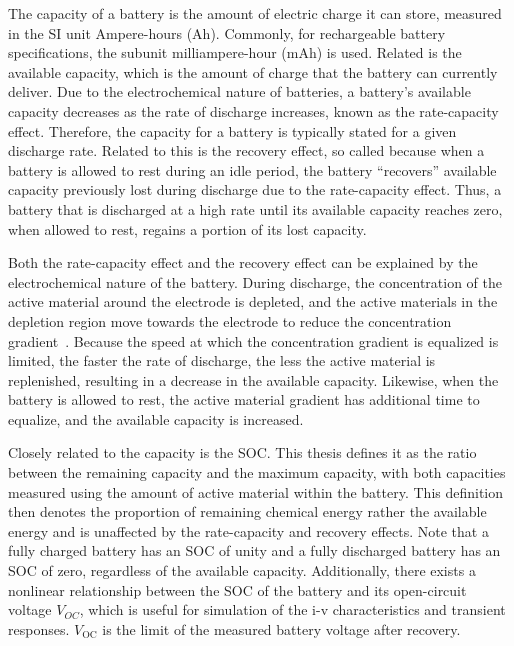 \documentclass[../zhang_thesis.tex]{subfiles}
\begin{document}
The capacity of a battery is the amount of electric charge it can store, measured in the SI unit Ampere-hours (Ah). Commonly, for rechargeable battery specifications, the subunit milliampere-hour (mAh) is used. Related is the available capacity, which is the amount of charge that the battery can currently deliver. Due to the electrochemical nature of batteries, a battery's available capacity decreases as the rate of discharge increases, known as the rate-capacity effect. Therefore, the capacity for a
battery is typically stated for a given discharge rate.  Related to this is the recovery effect, so called because when a battery is allowed to rest during an idle period, the battery ``recovers'' available capacity previously lost during discharge due to the rate-capacity effect. Thus, a battery that is discharged at a high rate until its available capacity reaches zero, when allowed to rest, regains a portion of its lost capacity.

Both the rate-capacity effect and the recovery effect can be explained by the electrochemical nature of the battery. During discharge, the concentration of the active material around the electrode is depleted, and the active materials in the depletion region move towards the electrode to reduce the concentration gradient~\cite{chiasserini99}. Because the speed at which the concentration gradient is equalized is limited, the faster the rate of discharge, the less the active material is
replenished, resulting in a decrease in the available capacity. Likewise, when the battery is allowed to rest, the active material gradient has additional time to equalize, and the available capacity is increased.

Closely related to the capacity is the SOC. This thesis defines it as the ratio between the remaining capacity and the maximum capacity, with both capacities measured using the amount of active material within the battery. This definition then denotes the proportion of remaining chemical energy rather the available energy and is unaffected by the rate-capacity and recovery effects. Note that a fully charged battery has an SOC of unity and a fully discharged battery has an SOC of zero, regardless
of the available capacity. Additionally, there exists a nonlinear relationship between the SOC of the battery and its open-circuit voltage $V_{OC}$, which is useful for simulation of the i-v characteristics and transient responses. $V_\text{OC}$ is the limit of the measured battery voltage after recovery.
\end{document}
